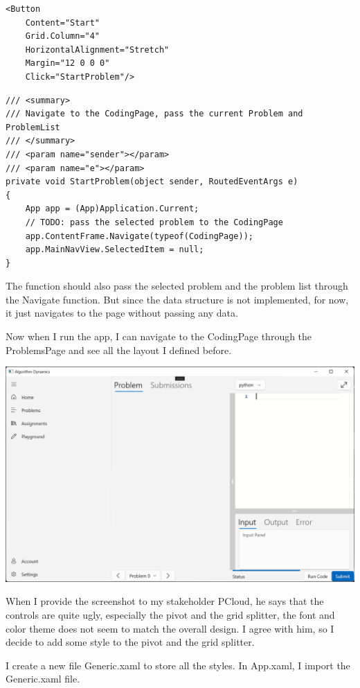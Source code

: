 \documentclass[a4paper]{report}
\begin{document}
\begin{verbatim}
<Button
    Content="Start"
    Grid.Column="4"
    HorizontalAlignment="Stretch"
    Margin="12 0 0 0"
    Click="StartProblem"/>
\end{verbatim}

\begin{verbatim}
/// <summary>
/// Navigate to the CodingPage, pass the current Problem and ProblemList
/// </summary>
/// <param name="sender"></param>
/// <param name="e"></param>
private void StartProblem(object sender, RoutedEventArgs e)
{
    App app = (App)Application.Current;
    // TODO: pass the selected problem to the CodingPage
    app.ContentFrame.Navigate(typeof(CodingPage));
    app.MainNavView.SelectedItem = null;
}
\end{verbatim}

The function should also pass the selected problem and the problem list through the Navigate function. But since the data structure is not implemented, for now, it just navigates to the page without passing any data.

Now when I run the app, I can navigate to the CodingPage through the ProblemsPage and see all the layout I defined before.

\includegraphics[width=\textwidth, height=\textheight, keepaspectratio]{CodingPage-Layout}

When I provide the screenshot to my stakeholder PCloud, he says that the controls are quite ugly, especially the pivot and the grid splitter, the font and color theme does not seem to match the overall design. I agree with him, so I decide to add some style to the pivot and the grid splitter.

I create a new file Generic.xaml to store all the styles. In App.xaml, I import the Generic.xaml file.
\end{document}
